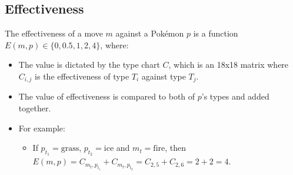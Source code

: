 \subsection{Effectiveness}

The effectiveness of a move $m$ against a Pokémon $p$ is a function $E(m, p) \in \{0, 0.5, 1, 2, 4\}$, where:
\begin{itemize}
    \item The value is dictated by the type chart $C$, which is an 18x18 matrix where $C_{i, j}$ is the effectiveness of type $T_i$ against type $T_j$.
    \item The value of effectiveness is compared to both of $p$'s types and added together.
    \item For example:
    \begin{itemize}
        \item If $p_{t_1} = \text{grass}$, $p_{t_2} = \text{ice}$ and $m_t = \text{fire}$, then $E(m, p) = C_{m_t, p_{t_1}} + C_{m_t, p_{t_2}} = C_{2, 5} + C_{2, 6} = 2 + 2 = 4$.
    \end{itemize}
\end{itemize}

